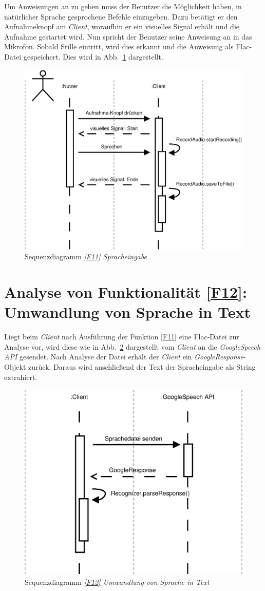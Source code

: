 Um Anweisungen an \NewsGenie zu geben muss der Benutzer die Möglichkeit haben,
in natürlicher Sprache gesprochene Befehle einzugeben. Dazu betätigt er den
Aufnahmeknopf am \textit{Client}, woraufhin er ein visuelles Signal erhält und
die Aufnahme gestartet wird. Nun spricht der Benutzer seine Anweisung an \NewsGenie in das
Mikrofon. Sobald Stille eintritt, wird dies erkannt und die Anweisung als
Flac-Datei gespeichert. Dies wird in Abb.~\ref{sd11} dargestellt.

\begin{figure}[h]
\centering
\includegraphics[width=.7\textwidth]{Systementwurf/02_produktfunktionsanalyse/f110}
\caption{Sequenzdiagramm \textit{\ref{F11} Spracheingabe} \label{sd11}}
\end{figure}

\FloatBarrier

\section{Analyse von Funktionalität \ref{F12}: Umwandlung von Sprache in Text}

Liegt beim \textit{Client} nach Ausführung der Funktion \ref{F11} eine
Flac-Datei zur Analyse vor, wird diese wie in Abb.~\ref{sd12} dargestellt vom
\textit{Client} an die \textit{GoogleSpeech API} gesendet. Nach Analyse der
Datei erhält der \textit{Client} ein \textit{GoogleResponse}-Objekt zurück.
Daraus wird anschließend der Text der Spracheingabe als String extrahiert.

\begin{figure}[h]
\centering
\includegraphics[width=.5\textwidth]{Systementwurf/02_produktfunktionsanalyse/f120}
\caption{Sequenzdiagramm \textit{\ref{F12} Umwandlung von Sprache in Text}
\label{sd12}}
\end{figure}


